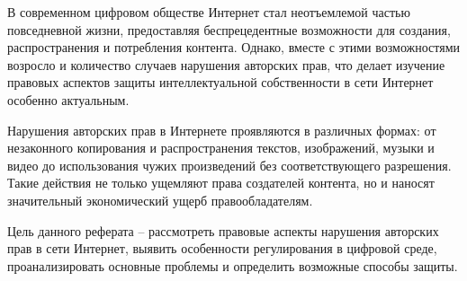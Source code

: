 
В современном цифровом обществе Интернет стал неотъемлемой частью повседневной жизни,
предоставляя беспрецедентные возможности для создания, распространения и потребления
контента. Однако, вместе с этими возможностями возросло и количество случаев нарушения
авторских прав, что делает изучение правовых аспектов защиты интеллектуальной
собственности в сети Интернет особенно актуальным.

Нарушения авторских прав в Интернете проявляются в различных формах: от незаконного
копирования и распространения текстов, изображений, музыки и видео до использования
чужих произведений без соответствующего разрешения. Такие действия не только ущемляют
права создателей контента, но и наносят значительный экономический ущерб
правообладателям.

Цель данного реферата – рассмотреть правовые аспекты нарушения авторских прав в сети Интернет, выявить особенности регулирования в цифровой среде, проанализировать основные проблемы и определить возможные способы защиты.

